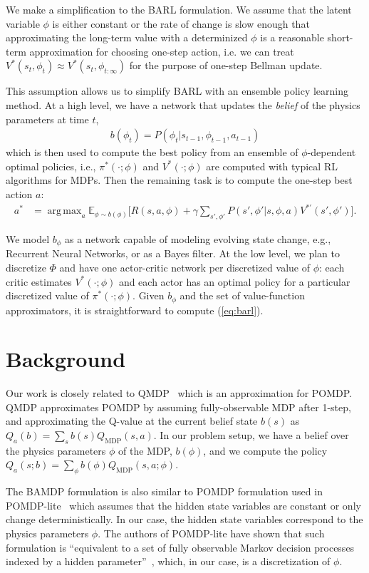 \documentclass{article}
\DeclareMathOperator*{\argmax}{arg\,max}
\begin{document}
We make a simplification to the BARL formulation. We assume that the latent variable $\phi$ is either constant or the rate of change is slow enough that approximating the long-term value with a determinized $\phi$ is a reasonable short-term approximation for choosing one-step action, i.e. we can treat $V^*(s_t, \phi_t) \approx V^*(s_t, \phi_{t:\infty})$ for the purpose of one-step Bellman update.

This assumption allows us to simplify BARL with an ensemble policy learning method. At a high level, we have a network that updates the \emph{belief} of the physics parameters at time $t$,
\begin{align*}
b(\phi_t) = P(\phi_t|s_{t-1}, \phi_{t-1}, a_{t-1})
\end{align*}
which is then used to compute the best policy from an ensemble of $\phi$-dependent optimal policies, i.e., $\pi^*(\cdot;\phi)$ and $V^*(\cdot;\phi)$ are computed with typical RL algorithms for MDPs. Then the remaining task is to compute the one-step best action $a$:
\begin{align}\label{eq:barl}
 a^* &= \argmax_{a} \mathbb{E}_{\phi \sim b(\phi)} \bigg[R(s, a, \phi) + \gamma \sum_{s', \phi'}P(s',\phi'|s, \phi, a)V^{*'}(s', \phi') \bigg].
\end{align}

We model $b_\phi$ as a network capable of modeling evolving state change, e.g., Recurrent Neural Networks, or as a Bayes filter. At the low level, we plan to discretize $\Phi$ and have one actor-critic network per discretized value of $\phi$: each critic estimates $V^*(\cdot;\phi)$ and each actor has an optimal policy for a particular discretized value of $\pi^*(\cdot;\phi)$. Given $b_\phi$ and the set of value-function approximators, it is straightforward to compute (\ref{eq:barl}).

\section{Background}
Our work is closely related to QMDP~\cite{littman1995learning, karkus2017qmdp} which is an approximation for POMDP. QMDP approximates POMDP by assuming fully-observable MDP after 1-step, and approximating the Q-value at the current belief state $b(s)$ as $Q_a(b) =\sum_s b(s)Q_{\text{MDP}}(s, a)$. In our problem setup, we have a belief over the physics parameters $\phi$ of the MDP, $b(\phi)$, and we compute the policy $Q_a(s;b) = \sum_\phi b(\phi)Q_{\text{MDP}}(s,a;\phi)$.

The BAMDP formulation is also similar to POMDP formulation used in POMDP-lite~\cite{chen2016pomdp} which assumes that the hidden state variables are constant or only change deterministically. In our case, the hidden state variables correspond to the physics parameters $\phi$. The authors of POMDP-lite have shown that such formulation is ``equivalent to a set of fully observable Markov decision processes indexed by a hidden parameter''~\cite{chen2016pomdp}, which, in our case, is a discretization of $\phi$.
\end{document}
